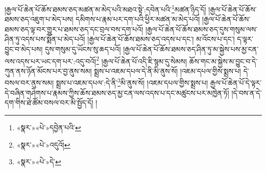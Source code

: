 །རྒྱལ་པོ་ཆེན་པོ་ཆོས་ཐམས་ཅད་མཚན་མ་མེད་པའི་མཐའ་སྟེ་:དབེན་པའི་\footnote{«སྣར་»«པེ་»དབྱེན་པའི་}མཚན་ཉིད་དོ། །རྒྱལ་པོ་ཆེན་པོ་ཆོས་ཐམས་ཅད་འཇུག་པ་མེད་པས། དམིགས་པ་རྣམ་པར་དག་པའི་ཕྱིར་མཚན་མ་མེད་པའོ། །རྒྱལ་པོ་ཆེན་པོ་ཆོས་ཐམས་ཅད་ལྟ་བར་གྱུར་པ་ཐམས་ཅད་དང་བྲལ་བས་དག་པའོ། །རྒྱལ་པོ་ཆེན་པོ་ཆོས་ཐམས་ཅད་དུས་གསུམ་ལས་ཤིན་ཏུ་འདས་པས་སྨོན་པ་མེད་པའོ། །རྒྱལ་པོ་ཆེན་པོ་ཆོས་ཐམས་ཅད་འདས་པ་དང་། མ་འོངས་པ་དང་། ད་ལྟར་བྱུང་བ་མེད་པས། དུས་གསུམ་དུ་ཡོངས་སུ་ཆད་པའོ། །རྒྱལ་པོ་ཆེན་པོ་ཆོས་ཐམས་ཅད་ཤིན་ཏུ་མ་སྐྱེས་པས་མྱ་ངན་ལས་འདས་པར་ཡང་དག་པར་:འདུ་བའོ།\footnote{«སྣར་»«པེ་»འདུའོ།} །རྒྱལ་པོ་ཆེན་པོ་འདི་ཇི་སྙམ་དུ་སེམས། ཆོས་གང་མ་སྐྱེས་མ་བྱུང་བ་དེ་ཀུན་ནས་ཉོན་མོངས་པར་བྱ་ནུས་སམ། སྨྲས་པ་འཇམ་དཔལ་དེ་ནི་མི་ནུས་སོ། །འཇམ་དཔལ་གྱིས་སྨྲས་པ། དེ་བསལ་བར་ནུས་སམ། སྨྲས་པ་འཇམ་དཔལ་:དེ་ནི་\footnote{«སྣར་»«པེ་»དེ་}མི་ནུས་སོ། །འཇམ་དཔལ་གྱིས་སྨྲས་པ། རྒྱལ་པོ་ཆེན་པོ་དེ་ལྟར་དེ་བཞིན་གཤེགས་པ་རྣམས་ཀྱིས་ཆོས་ཐམས་ཅད་མྱ་ངན་ལས་འདས་པ་དང་མཚུངས་པར་མཁྱེན་ཏོ། །དེ་བས་ན་དེ་དག་གིས་ཐེ་ཚོམ་བསལ་བར་མི་སྤྱོད་དོ། །
